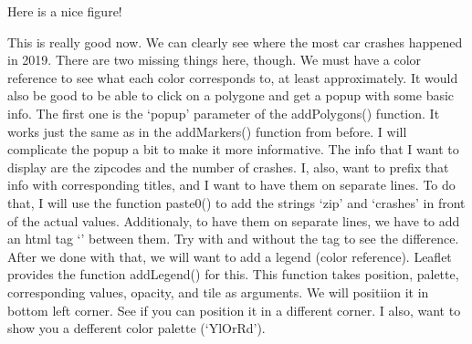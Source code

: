 \documentclass[]{book}
\newenvironment{Shaded}{\begin{snugshade}}{\end{snugshade}}
\newcommand{\CommentTok}[1]{\textcolor[rgb]{0.56,0.35,0.01}{\textit{#1}}}
\newcommand{\DataTypeTok}[1]{\textcolor[rgb]{0.13,0.29,0.53}{#1}}
\newcommand{\DecValTok}[1]{\textcolor[rgb]{0.00,0.00,0.81}{#1}}
\newcommand{\FloatTok}[1]{\textcolor[rgb]{0.00,0.00,0.81}{#1}}
\newcommand{\KeywordTok}[1]{\textcolor[rgb]{0.13,0.29,0.53}{\textbf{#1}}}
\newcommand{\NormalTok}[1]{#1}
\newcommand{\OperatorTok}[1]{\textcolor[rgb]{0.81,0.36,0.00}{\textbf{#1}}}
\newcommand{\StringTok}[1]{\textcolor[rgb]{0.31,0.60,0.02}{#1}}
\begin{document}
\begin{Shaded}
\end{Shaded}

\hypertarget{htmlwidget-2f9b6dc614afcbf262a2}{}

\label{fig:nice-fig89}Here is a nice figure!

This is really good now. We can clearly see where the most car crashes happened in 2019. There are two missing things here, though. We must have a color reference to see what each color corresponds to, at least approximately. It would also be good to be able to click on a polygone and get a popup with some basic info. The first one is the `popup' parameter of the addPolygons() function. It works just the same as in the addMarkers() function from before. I will complicate the popup a bit to make it more informative. The info that I want to display are the zipcodes and the number of crashes. I, also, want to prefix that info with corresponding titles, and I want to have them on separate lines. To do that, I will use the function paste0() to add the strings `zip' and `crashes' in front of the actual values. Additionaly, to have them on separate lines, we have to add an html tag `' between them. Try with and without the tag to see the difference. After we done with that, we will want to add a legend (color reference). Leaflet provides the function addLegend() for this. This function takes position, palette, corresponding values, opacity, and tile as arguments. We will positiion it in bottom left corner. See if you can position it in a different corner. I also, want to show you a defferent color palette (`YlOrRd').
\end{document}
